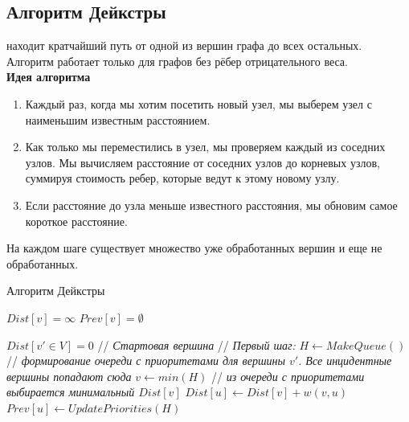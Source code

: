     \subsection{Алгоритм Дейкстры}
         находит кратчайший путь от одной из вершин графа до всех остальных. Алгоритм работает только для графов без рёбер отрицательного веса.\\

        \textbf{Идея алгоритма}
        \begin{enumerate}
            \item Каждый раз, когда мы хотим посетить новый узел, мы выберем узел с наименьшим известным расстоянием.
            \item Как только мы переместились в узел, мы проверяем каждый из соседних узлов. Мы вычисляем расстояние от соседних узлов до корневых узлов, суммируя стоимость ребер, которые ведут к этому новому узлу.
            \item Если расстояние до узла меньше известного расстояния, мы обновим самое короткое расстояние.
        \end{enumerate}
        На каждом шаге существует множество уже обработанных вершин и еще не обработанных.\\

        \begin{algorithm}
            \caption{Алгоритм Дейкстры}
            \begin{algorithmic}
                    \STATE $Dist[v] = \infty$
                    \STATE $Prev[v] = \emptyset$
                \ENDFOR

                \STATE $Dist[v' \in V] = 0$ // \textit{Стартовая вершина}
                \STATE // \textit{Первый шаг:}
                \STATE $H \longleftarrow MakeQueue()$ // \textit{формирование очереди с приоритетами для вершины $v'$. Все инцидентные вершины попадают сюда}
                    \STATE $v \longleftarrow min(H)$ // \textit{из очереди с приоритетами выбирается минимальный $Dist[v]$}
                            \STATE $Dist[u] \longleftarrow Dist[v] + w(v,u)$
                            \STATE $Prev[u] \longleftarrow UpdatePriorities(H)$
                        \ENDIF
                    \ENDFOR
                \ENDWHILE
            \end{algorithmic}
        \end{algorithm}
        
